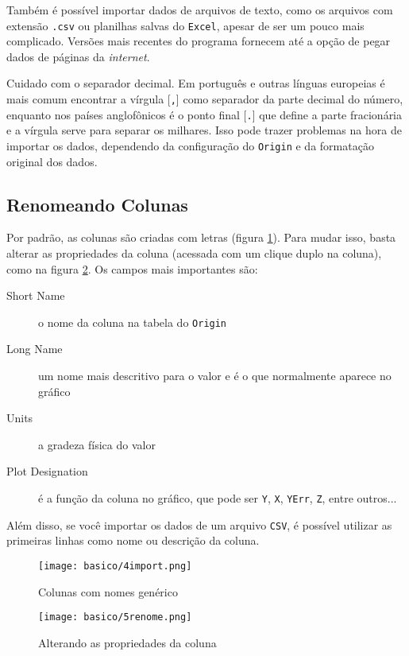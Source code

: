     Também é possível importar dados de arquivos de texto, como os arquivos com extensão \texttt{.csv} ou planilhas salvas do \texttt{Excel}, apesar de ser um pouco mais complicado. Versões mais recentes do programa fornecem até a opção de pegar dados de páginas da \textit{internet}.

    \begin{lembrete}
        Cuidado com o separador decimal. Em português e outras línguas europeias é mais comum encontrar a vírgula [\texttt{,}] como separador da parte decimal do número, enquanto nos países anglofônicos é o ponto final [\texttt{.}] que define a parte fracionária e a vírgula serve para separar os milhares. Isso pode trazer problemas na hora de importar os dados, dependendo da configuração do \texttt{Origin} e da formatação original dos dados.
    \end{lembrete}


\subsection{Renomeando Colunas} \label{sec:basico:renome}

    Por padrão, as colunas são criadas com letras (figura \ref{fig:basico:importado}). Para mudar isso, basta alterar as propriedades da coluna (acessada com um clique duplo na coluna), como na figura \ref{fig:basico:renomear}. Os campos mais importantes são:

    \begin{description}
        \item[Short Name] o nome da coluna na tabela do \texttt{Origin}
        \item[Long Name] um nome mais descritivo para o valor e é o que normalmente aparece no gráfico
        \item[Units] a gradeza física do valor
        \item[Plot Designation] é a função da coluna no gráfico, que pode ser \texttt{Y}, \texttt{X}, \texttt{YErr}, \texttt{Z}, entre outros...
    \end{description}

    Além disso, se você importar os dados de um arquivo \texttt{CSV}, é possível utilizar as primeiras linhas como nome ou descrição da coluna.

    \begin{figure}[htbp]
        \centering
        \texttt{[image: basico/4import.png]}

        \caption{Colunas com nomes genérico}
        \label{fig:basico:importado}
    \end{figure}

    \begin{figure}[htbp]
        \centering
        \texttt{[image: basico/5renome.png]}

        \caption{Alterando as propriedades da coluna}
        \label{fig:basico:renomear}
    \end{figure}

